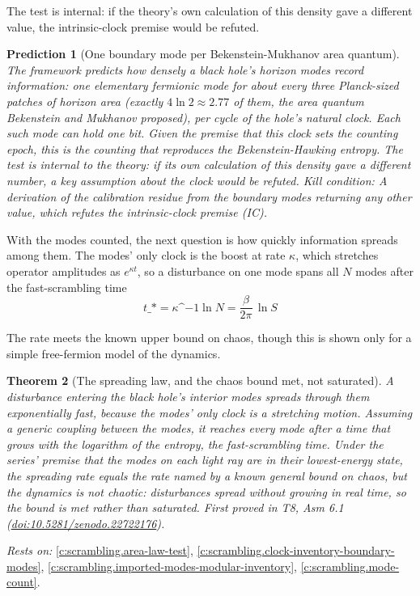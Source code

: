 \documentclass[11pt]{article}
\newtheorem{theorem}{Theorem}[section]
\newtheorem{prediction}[theorem]{Prediction}
\theoremstyle{definition}
\theoremstyle{plain}
\begin{document}
The test is internal: if the theory's own calculation of this density gave a different value, the intrinsic-clock premise would be refuted.

\begin{prediction}[One boundary mode per Bekenstein-Mukhanov area quantum]\label{c:pred.boundary-mode-density}
The framework predicts how densely a black hole's horizon modes record information: one elementary fermionic mode for about every three Planck-sized patches of horizon area (exactly $4\ln 2 \approx 2.77$ of them, the area quantum Bekenstein and Mukhanov proposed), per cycle of the hole's natural clock. Each such mode can hold one bit. Given the premise that this clock sets the counting epoch, this is the counting that reproduces the Bekenstein-Hawking entropy. The test is internal to the theory: if its own calculation of this density gave a different number, a key assumption about the clock would be refuted.
\emph{Kill condition:} A derivation of the calibration residue from the boundary modes returning any other value, which refutes the intrinsic-clock premise (IC).
\end{prediction}

With the modes counted, the next question is how quickly information spreads among them. The modes' only clock is the boost at rate $\kappa$, which stretches operator amplitudes as $e^{\kappa t}$, so a disturbance on one mode spans all $N$ modes after the fast-scrambling time \[ t\_* = \kappa\^{}{-1}\ln N = \frac{\beta}{2\pi}\,\ln S \]

The rate meets the known upper bound on chaos, though this is shown only for a simple free-fermion model of the dynamics.

\begin{theorem}[The spreading law, and the chaos bound met, not saturated]\label{c:scrambling.spreading-law-chaos-bound-saturated}
A disturbance entering the black hole's interior modes spreads through them exponentially fast, because the modes' only clock is a stretching motion. Assuming a generic coupling between the modes, it reaches every mode after a time that grows with the logarithm of the entropy, the fast-scrambling time. Under the series' premise that the modes on each light ray are in their lowest-energy state, the spreading rate equals the rate named by a known general bound on chaos, but the dynamics is not chaotic: disturbances spread without growing in real time, so the bound is met rather than saturated.
\emph{First proved in} T8, Asm 6.1 (\href{https://doi.org/10.5281/zenodo.22722176}{doi:10.5281/zenodo.22722176}).
\end{theorem}
\noindent\emph{Rests on:} \ref{c:scrambling.area-law-test}, \ref{c:scrambling.clock-inventory-boundary-modes}, \ref{c:scrambling.imported-modes-modular-inventory}, \ref{c:scrambling.mode-count}.
\end{document}
